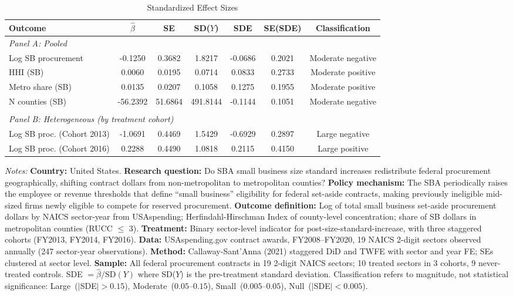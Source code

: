 \begin{table}[htbp]
\centering
\begin{threeparttable}
\caption{Standardized Effect Sizes}
\label{tab:sde}
\small
\begin{adjustbox}{max width=\textwidth}
\begin{tabular}{lcccccc}
\toprule
Outcome & $\hat{\beta}$ & SE & SD($Y$) & SDE & SE(SDE) & Classification \\
\midrule
\multicolumn{7}{l}{\textit{Panel A: Pooled}} \\
Log SB procurement & -0.1250 & 0.3682 & 1.8217 & -0.0686 & 0.2021 & Moderate negative \\
HHI (SB) & 0.0060 & 0.0195 & 0.0714 & 0.0833 & 0.2733 & Moderate positive \\
Metro share (SB) & 0.0135 & 0.0207 & 0.1058 & 0.1275 & 0.1955 & Moderate positive \\
N counties (SB) & -56.2392 & 51.6864 & 491.8144 & -0.1144 & 0.1051 & Moderate negative \\
 & & & & & & \\
\multicolumn{7}{l}{\textit{Panel B: Heterogeneous (by treatment cohort)}} \\
Log SB proc. (Cohort 2013) & -1.0691 & 0.4469 & 1.5429 & -0.6929 & 0.2897 & Large negative \\
Log SB proc. (Cohort 2016) & 0.2288 & 0.4490 & 1.0818 & 0.2115 & 0.4150 & Large positive \\
\bottomrule
\end{tabular}
\end{adjustbox}
\begin{tablenotes}[flushleft]
\scriptsize
\item \textit{Notes:} \textbf{Country:} United States. \textbf{Research question:} Do SBA small business size standard increases redistribute federal procurement geographically, shifting contract dollars from non-metropolitan to metropolitan counties? \textbf{Policy mechanism:} The SBA periodically raises the employee or revenue thresholds that define ``small business'' eligibility for federal set-aside contracts, making previously ineligible mid-sized firms newly eligible to compete for reserved procurement. \textbf{Outcome definition:} Log of total small business set-aside procurement dollars by NAICS sector-year from USAspending; Herfindahl-Hirschman Index of county-level concentration; share of SB dollars in metropolitan counties (RUCC $\leq$ 3). \textbf{Treatment:} Binary sector-level indicator for post-size-standard-increase, with three staggered cohorts (FY2013, FY2014, FY2016). \textbf{Data:} USAspending.gov contract awards, FY2008--FY2020, 19 NAICS 2-digit sectors observed annually (247 sector-year observations). \textbf{Method:} Callaway-Sant'Anna (2021) staggered DiD and TWFE with sector and year FE; SEs clustered at sector level. \textbf{Sample:} All federal procurement contracts in 19 2-digit NAICS sectors; 10 treated sectors in 3 cohorts, 9 never-treated controls. SDE $= \hat{\beta} / \text{SD}(Y)$ where SD($Y$) is the pre-treatment standard deviation. Classification refers to magnitude, not statistical significance: Large~($|$SDE$|{>}0.15$), Moderate~($0.05$--$0.15$), Small~($0.005$--$0.05$), Null~($|$SDE$|{<}0.005$).

\end{tablenotes}
\end{threeparttable}
\end{table}
